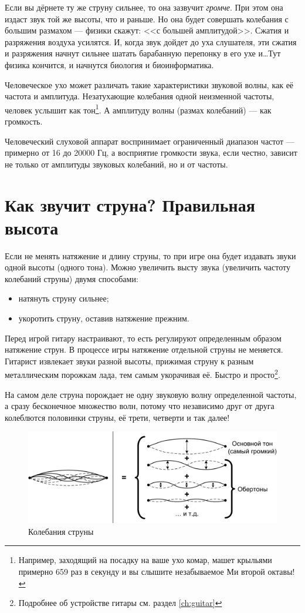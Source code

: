 Если вы дёрнете ту же струну сильнее, то она зазвучит \emph{громче}. При этом она издаст звук той же высоты, что и раньше. Но она будет совершать колебания с большим размахом --- физики скажут: <<с большей амплитудой>>. Сжатия и разряжения воздуха усилятся. И, когда звук дойдет до уха слушателя, эти сжатия и разряжения начнут сильнее шатать барабанную перепонку в его ухе и\ldots Тут физика кончится, и начнутся биология и биоинформатика.

Человеческое ухо может различать такие характеристики звуковой волны, как её частота и амплитуда. Незатухающие колебания одной неизменной частоты, человек услышит как тон\footnote{Например, заходящий на посадку на ваше ухо комар, машет крыльями примерно 659 раз в секунду и вы слышите незабываемое Ми второй октавы!}. А амплитуду волны (размах колебаний) --- как громкость. 

Человеческий слуховой аппарат воспринимает ограниченный диапазон частот --- примерно от 16 до 20000 Гц, а восприятие громкости звука, если честно, зависит не только от амплитуды звуковых колебаний, но и от частоты. 


\section{Как звучит струна? Правильная высота}
\label{ch:music:tone}

Если не менять натяжение и длину струны, то при игре она будет издавать звуки одной высоты (одного тона). Можно увеличить высту звука (увеличить частоту колебаний струны) двумя способами:
\begin{itemize}
    \item натянуть струну сильнее;
    \item укоротить струну, оставив натяжение прежним.
\end{itemize}

Перед игрой гитару настраивают, то есть регулируют определенным образом натяжение струн. В процессе игры натяжение отдельной струны не меняется. Гитарист извлекает звуки разной высоты, прижимая струну к разным металлическим порожкам лада, тем самым укорачивая её. Быстро и просто\footnote{Подробнее об устройстве гитары см. раздел \ref{ch:guitar}}.

На самом деле струна порождает не одну звуковую волну определенной частоты, а сразу бесконечное множество волн, потому что независимо друг от друга колеблются половинки струны, её трети, четверти и так далее!

\begin{figure}[!ht]
    \centering
    \includegraphics{fig/string-moving} 
    \caption{Колебания струны}\label{fig:music:tone:stringmoving}
\end{figure} 

